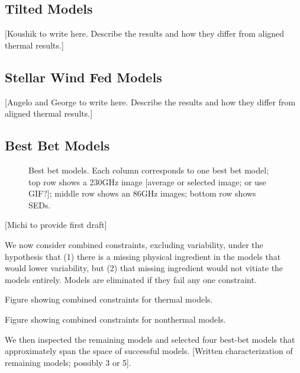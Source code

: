 \subsection{Tilted Models}

[Koushik to write here.  Describe the results and how they differ from aligned thermal results.]


\subsection{Stellar Wind Fed Models}

[Angelo and George to write here.  Describe the results and how they differ from aligned thermal results.]


\subsection{Best Bet Models}

\begin{figure}
    \caption{Best bet models.  Each column corresponds to one best bet model; top row shows a 230GHz image [average or selected image; or use GIF?]; middle row shows an 86GHz images; bottom row shows SEDs.}
    \label{fig:my_label}
\end{figure}

[Michi to provide first draft]

We now consider combined constraints, excluding variability, under the hypothesis that (1) there is a missing physical ingredient in the models that would lower variability, but (2) that missing ingredient would not vitiate the models entirely.  Models are eliminated if they fail any one constraint.

Figure showing combined constraints for thermal models.

Figure showing combined constraints for nonthermal models.

We then inspected the remaining models and selected four best-bet models that approximately span the space of successful models.  [Written characterization of remaining models; possibly 3 or 5].
